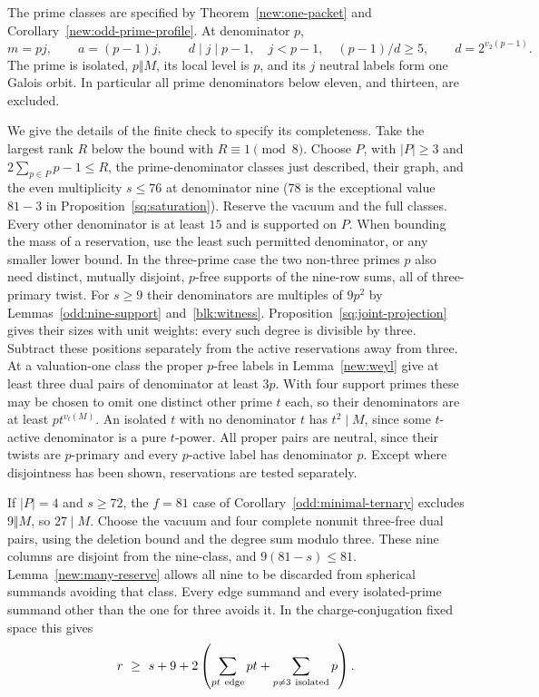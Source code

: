 \documentclass[11pt]{amsart}
\numberwithin{equation}{section}
\theoremstyle{definition}
\theoremstyle{plain}
\begin{document}
The prime classes are specified by Theorem~\ref{new:one-packet}
and Corollary~\ref{new:odd-prime-profile}. At denominator $p$,
\[
 m=pj,\qquad a=(p-1)j,\qquad
 d\mid j\mid p-1,\quad j<p-1,\quad (p-1)/d\ge5,
 \qquad d=2^{v_2(p-1)}.
\]
The prime is isolated, $p\Vert M$, its local level is $p$, and its
$j$ neutral labels form one Galois orbit. In particular all prime
denominators below eleven, and thirteen, are excluded.

We give the details of the finite check to specify its completeness.
Take the largest rank $R$ below the bound with $R\equiv1\pmod8$.
Choose $P$, with $|P|\ge3$ and $2\sum_{p\in P}p-1\le R$,
the prime-denominator classes just described, their graph, and the
even multiplicity $s\le76$ at denominator nine ($78$ is the
exceptional value $81-3$ in Proposition~\ref{sq:saturation}).
Reserve the vacuum and the full classes. Every other denominator is
at least $15$ and is supported on $P$. When bounding the mass of
a reservation, use the least such permitted denominator, or any
smaller lower bound. In the three-prime case the two non-three primes
$p$ also need distinct, mutually disjoint, $p$-free supports of
the nine-row sums, all of three-primary twist. For $s\ge9$ their
denominators are multiples of $9p^2$ by Lemmas~\ref{odd:nine-support}
and~\ref{blk:witness}. Proposition~\ref{sq:joint-projection} gives their sizes with unit weights:
every such degree is divisible by three. Subtract these positions
separately from the active reservations away from three.
At a valuation-one class the proper $p$-free labels in
Lemma~\ref{new:weyl} give at least three dual pairs of denominator
at least $3p$. With four support primes these may be chosen to
omit one distinct other prime $t$ each, so their denominators
are at least $p t^{v_t(M)}$. An isolated $t$ with no denominator
$t$ has $t^2\mid M$, since some $t$-active denominator is a pure
$t$-power. All proper pairs are neutral, since their twists are
$p$-primary and every $p$-active label has denominator $p$. Except where
disjointness has been shown, reservations are tested separately.

If $|P|=4$ and $s\ge72$, the $f=81$ case of
Corollary~\ref{odd:minimal-ternary} excludes $9\Vert M$, so $27\mid M$. Choose the vacuum and four complete nonunit three-free
dual pairs, using the deletion bound and the degree sum modulo three.
These nine columns are disjoint from the nine-class, and
$9(81-s)\le81$. Lemma~\ref{new:many-reserve} allows all nine to
be discarded from spherical summands avoiding that class. Every
edge summand and every isolated-prime summand other than the one
for three avoids it. In the charge-conjugation fixed space this gives
\[
 r\ \ge\ s+9+
 2\left(\sum_{pt\ {\rm edge}}pt+
             \sum_{p\ne3\ {\rm isolated}}p\right).
\]
\end{document}
